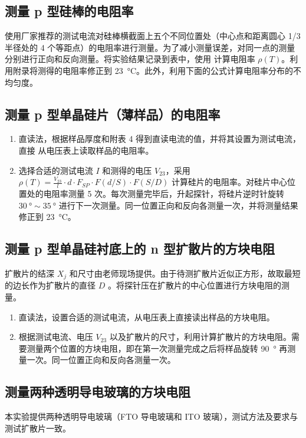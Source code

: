 \documentclass[a4paper,utf8]{article}
\begin{document}
    \subsection{测量 p 型硅棒的电阻率}
        使用厂家推荐的测试电流对硅棒横截面上五个不同位置处（中心点和距离圆心 1/3 半径处的 4 个等距点）的电阻率进行测量。为了减小测量误差，对同一点的测量分别进行正向和反向测量。将实验结果记录到表中，使用 计算电阻率 $\rho (T)$。利用附录将测得的电阻率修正到 \SI{23}{\degreeCelsius}。此外，利用下面的公式计算电阻率分布的不均匀度。
    \subsection{测量 p 型单晶硅片（薄样品）的电阻率}
        \begin{enumerate}
            \item 直读法，根据样品厚度和附表 4 得到直读电流的值，并将其设置为测试电流，直接
            从电压表上读取样品的电阻率。
            \item 选择合适的测试电流 $I$ 和测得的电压 $V_{23}$，采用 $\rho(T)=\frac{V_{23}}l\cdot d\cdot F_{SP}\cdot F(d/S)\cdot F(S/D)$ 计算硅片的电阻率。对硅片中心位置处的电阻率测量 5 次。每次测量完毕后，升起探针，将硅片逆时针旋转 $\SI{30}{\degree} \sim  \SI{35}{\degree}$ 进行下一次测量。同一位置正向和反向各测量一次，并将测量结果修正到 \SI{23}{\degreeCelsius}。
        \end{enumerate}
    \subsection{测量 p 型单晶硅衬底上的 n 型扩散片的方块电阻}
        扩散片的结深 $X_j$ 和尺寸由老师现场提供。由于待测扩散片近似正方形，故取最短的边长作为扩散片的直径 $D$ 。将探针压在扩散片的中心位置进行方块电阻的测量。
        \begin{enumerate}
            \item 直读法，设置合适的测试电流，从电压表上直接读出样品的方块电阻。
            \item 根据测试电流、电压 $V_{23}$ 以及扩散片的尺寸，利用计算扩散片的方块电阻。需要测量两个位置的方块电阻，即在第一次测量完成之后将样品旋转 \SI{90}{\degree} 再测量一次。同一位置正向和反向各测量一次。
        \end{enumerate}
    \subsection{测量两种透明导电玻璃的方块电阻}
        本实验提供两种透明导电玻璃（FTO 导电玻璃和 ITO 玻璃），测试方法及要求与测试扩散片一致。
        \pagebreak
\end{document}
